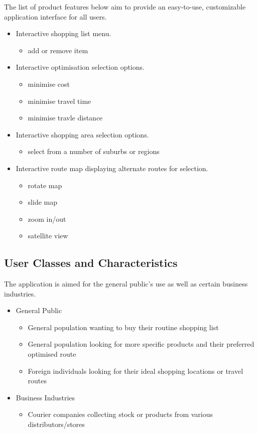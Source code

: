 \documentclass[10pt, a4paper, twocolumn]{scrartcl}
\begin{document}
			The list of product features below aim to provide an easy-to-use, customizable application interface for all users. 
	
			\begin{itemize}
				\item Interactive shopping list menu.
				\begin{itemize}
					\item add or remove item
				\end{itemize}
				\item Interactive optimisation selection options.
				\begin{itemize}
					\item minimise cost
					\item minimise travel time
					\item minimise travle distance
				\end{itemize}
				\item Interactive shopping area selection options.
				\begin{itemize}
					\item select from a number of suburbs or regions
				\end{itemize}
				\item Interactive route map displaying alternate routes for selection.
				\begin{itemize}
					\item rotate map
					\item slide map
					\item zoom in/out
					\item satellite view
				\end{itemize}
			\end{itemize}
	
		\subsection{User Classes and Characteristics}
	
			The application is aimed for the general public's use as well as certain business industries. 
	
			\begin{itemize}
				\item General Public
				\begin{itemize}
					\item General population wanting to buy their routine shopping list
					\item General population looking for more specific products and their preferred optimised route
					\item Foreign individuals looking for their ideal shopping locations or travel routes
				\end{itemize}
				\item Business Industries
				\begin{itemize}
					\item Courier companies collecting stock or products from various distributors/stores
				\end{itemize}
			\end{itemize}
	
\end{document}
